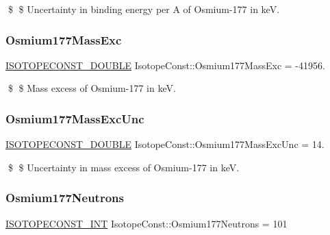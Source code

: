 \$ \$ Uncertainty in binding energy per A of Osmium-\/177 in keV. \mbox{\label{group___isotope_const-_osmium-_os177_ga910a5c034acf7bba16fda41ab2665b0c}} 
\subsubsection{\texorpdfstring{Osmium177\+Mass\+Exc}{Osmium177MassExc}}
{\footnotesize\ttfamily \mbox{\hyperlink{group___isotope_const-_macros_ga8f45a7272ce02c0b4c65c44636ed719a}{I\+S\+O\+T\+O\+P\+E\+C\+O\+N\+S\+T\+\_\+\+D\+O\+U\+B\+LE}} Isotope\+Const\+::\+Osmium177\+Mass\+Exc = -\/41956.}

\$ \$ Mass excess of Osmium-\/177 in keV. \mbox{\label{group___isotope_const-_osmium-_os177_ga79d2658e4f71ed1578d8eb3d15bd2144}} 
\subsubsection{\texorpdfstring{Osmium177\+Mass\+Exc\+Unc}{Osmium177MassExcUnc}}
{\footnotesize\ttfamily \mbox{\hyperlink{group___isotope_const-_macros_ga8f45a7272ce02c0b4c65c44636ed719a}{I\+S\+O\+T\+O\+P\+E\+C\+O\+N\+S\+T\+\_\+\+D\+O\+U\+B\+LE}} Isotope\+Const\+::\+Osmium177\+Mass\+Exc\+Unc = 14.}

\$ \$ Uncertainty in mass excess of Osmium-\/177 in keV. \mbox{\label{group___isotope_const-_osmium-_os177_ga4c1db425a4b4935093490ad9c26e72ce}} 
\subsubsection{\texorpdfstring{Osmium177\+Neutrons}{Osmium177Neutrons}}
{\footnotesize\ttfamily \mbox{\hyperlink{group___isotope_const-_macros_ga5f18360b3e99483a35c32d789e62621c}{I\+S\+O\+T\+O\+P\+E\+C\+O\+N\+S\+T\+\_\+\+I\+NT}} Isotope\+Const\+::\+Osmium177\+Neutrons = 101}

